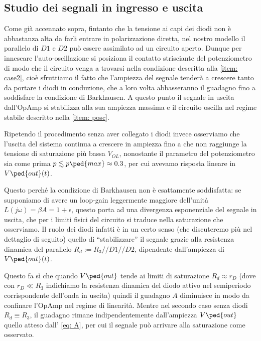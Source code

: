 \documentclass[10pt, a4paper, italian]{article}
\begin{document}
\subsection{Studio dei segnali in ingresso e uscita}
Come già accennato sopra, fintanto che la tensione ai capi dei diodi non è
abbastanza alta da farli entrare in polarizzazione diretta, nel nostro
modello il parallelo di $D1$ e $D2$ può essere assimilato ad un circuito
aperto.
Dunque per innescare l'auto-oscillazione si posiziona il contatto
strisciante del potenziometro di modo che il circuito venga a trovarsi nella
condizione descritta alla \cref{item: case2}, cioè sfruttiamo il fatto che
l'ampiezza del segnale tenderà a crescere tanto da portare i diodi in
conduzione, che a loro volta abbasseranno il guadagno fino a soddisfare la
condizione di Barkhausen.
A questo punto il segnale in uscita dall'OpAmp si stabilizza alla sua ampiezza
massima e il circuito oscilla nel regime stabile descritto nella
\cref{item: posc}.

Ripetendo il procedimento senza aver collegato i diodi invece osserviamo che
l'uscita del sistema continua a crescere in ampiezza fino a che non raggiunge
la tensione di saturazione più bassa $V_{OL}$, nonostante il parametro del
potenziometro sia come prima $p \lesssim p\ped{max} \approx 0.3$, per cui
avevamo risposta lineare in $V\ped{out} (t)$.

Questo perché la condizione di Barkhausen non è esattamente soddisfatta:
se supponiamo di avere un loop-gain leggermente maggiore dell'unità
$L(j\omega) = \beta A = 1 + \epsilon$, questo porta ad una divergenza
esponenziale del segnale in uscita, che per i limiti fisici del circuito
si traduce nella saturazione che osserviamo. Il ruolo dei diodi infatti è in
un certo senso (che discuteremo più nel dettaglio di seguito) quello di
``stabilizzare'' il segnale grazie alla resistenza dinamica del parallelo
$R_d := R_3 // D1 // D2$, dipendente dall'ampiezza di $V\ped{out} (t)$.

Questo fa sì che quando $V\ped{out}$ tende ai limiti di saturazione
$R_d \approx r_D$ (dove con $r_D \ll R_3$ indichiamo la resistenza dinamica
del diodo attivo nel semiperiodo corrispondente dell'onda in uscita)
quindi il guadagno $A$ diminuisce in modo da confinare l'OpAmp nel regime
di linearità.
Mentre nel secondo caso senza diodi $R_d \equiv R_3$, il guadagno rimane
indipendentemente dall'ampiezza $V\ped{out}$ quello atteso dall'
\cref{eq: A}, per cui il segnale può arrivare alla saturazione come osservato. 
\end{document}
